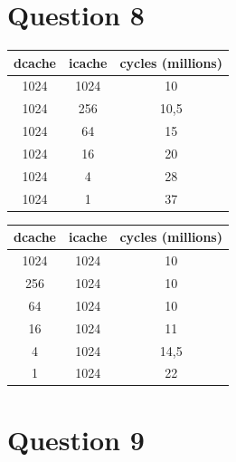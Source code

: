 \documentclass[12pt]{article}
\begin{document}
\section*{Question 8}
\begin{tabular}{|c|c|c|}
    \hline
    dcache & icache & cycles (millions) \\
    \hline
    1024 & 1024 & 10 \\
    1024 &  256 & 10,5 \\
    1024 &   64 & 15 \\
    1024 &   16 & 20 \\
    1024 &    4 & 28 \\
    1024 &    1 & 37 \\
    \hline
  \end{tabular}
  \hspace{2cm}
  \begin{tabular}{|c|c|c|}
    \hline
    dcache & icache & cycles (millions) \\
    \hline
    1024 & 1024 & 10 \\
     256 & 1024 & 10 \\
      64 & 1024 & 10 \\
      16 & 1024 & 11 \\
       4 & 1024 & 14,5 \\
       1 & 1024 & 22 \\
    \hline
  \end{tabular}
\section*{Question 9}
\end{document}
